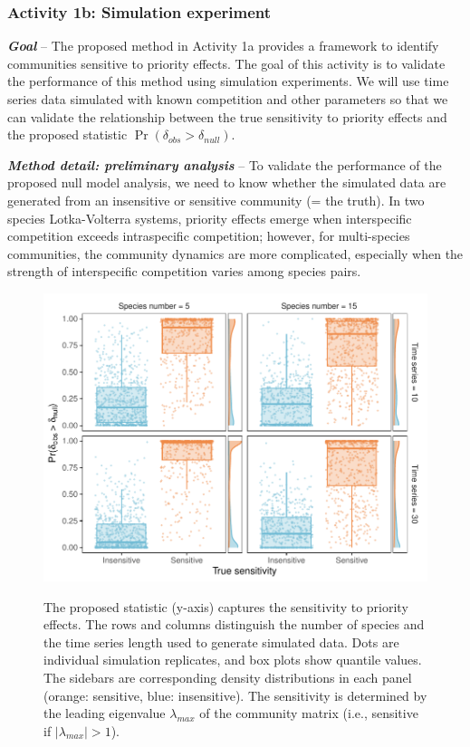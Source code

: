 \documentclass[12pt, class=article, crop=false]{standalone}
\begin{document}
\subsubsection*{Activity 1b: Simulation experiment}

\textbf{\textit{Goal}} -- 
The proposed method in Activity 1a provides a framework to identify communities sensitive to priority effects. The goal of this activity is to validate the performance of this method using simulation experiments.
We will use time series data simulated with known competition and other parameters so that we can validate the relationship between the true sensitivity to priority effects and the proposed statistic $\Pr(\delta_{obs} > \delta_{null})$.

\textbf{\textit{Method detail: preliminary analysis}} -- 
To validate the performance of the proposed null model analysis, we need to know whether the simulated data are generated from an insensitive or sensitive community (= the truth).
In two species Lotka-Volterra systems, priority effects emerge when interspecific competition exceeds intraspecific competition; however, for multi-species communities, the community dynamics are more complicated, especially when the strength of interspecific competition varies among species pairs.

\begin{figure}
    \caption{The proposed statistic (y-axis) captures the sensitivity to priority effects. The rows and columns distinguish the number of species and the time series length used to generate simulated data. Dots are individual simulation replicates, and box plots show quantile values.
    The sidebars are corresponding density distributions in each panel (orange: sensitive, blue: insensitive).
    The sensitivity is determined by the leading eigenvalue $\lambda_{max}$ of the community matrix (i.e., sensitive if $|\lambda_{max}| > 1$).}
    \includegraphics[scale=0.75]{output/figure_eigen.pdf}
    \label{fig:box}
\end{figure}
\end{document}

